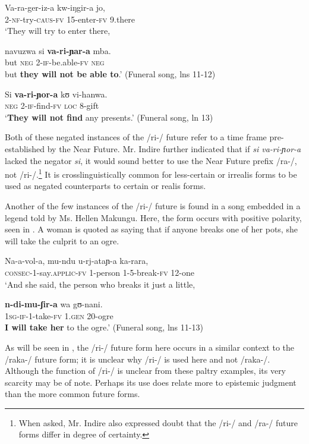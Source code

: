 \documentclass[output=paper]{langsci/langscibook}
\begin{document}
\ea\label{ex:sarvasy:9}
\gll Va-ra-ger-iz-a     kw-iŋgir-a   jo,\\ 
2-\textsc{nf}{}-try\textsc{{}-caus-fv}  15-enter-\textsc{fv}  9.there\\ 
\glt ‘They will try to enter there,

\gll navuzwa   si   \textbf{va-ri-ɲar-a}     mba. \\
but    \textsc{neg}  2-\textsc{if-}be.able-\textsc{fv}  \textsc{neg} \\
\glt but \textbf{they will not be able to}.’ (Funeral song, lns 11-12)
\z

\ea\label{ex:sarvasy:10}
\gll Si   \textbf{va-ri-ɲor-a}   kʊ   vi-hanwa. \\
\textsc{neg}  2-\textsc{if-}find-\textsc{fv}  \textsc{loc}  8-gift \\
\glt ‘\textbf{They will not find} any presents.’ (Funeral song, ln 13)
\z

Both of these negated instances of the /ri-/ future refer to a time frame pre-established by the Near Future. Mr. Indire further indicated that if \textit{si va-ri-ɲor-a }lacked the negator \textit{si}, it would sound better to use the Near Future prefix /ra-/, not /ri-/.\footnote{ When asked, Mr. Indire also expressed doubt that the /ri-/ and /ra-/ future forms differ in degree of certainty.} It is crosslinguistically common for less-certain or irrealis forms to be used as negated counterparts to certain or realis forms. 

Another of the few instances of the /ri-/ future is found in a song embedded in a legend told by Ms. Hellen Makungu. Here, the form occurs with positive polarity, seen in . A woman is quoted as saying that if anyone breaks one of her pots, she will take the culprit to an ogre.

\ea\label{ex:sarvasy:11}
\gll Na-a-vol-a,      mu-ndu  u-rj-ataɲ-a  ka-rara, \\
\textsc{consec-1}{}-say.\textsc{applic-fv}  1-person  1-5-break-\textsc{fv}  12-one \\
\glt ‘And she said, the person who breaks it just a little,

\gll \textbf{n-di-mu-ʃir-a}     wa   gʊ-nani. \\
\textsc{1sg-if-}1-take-\textsc{fv}  \textsc{1.gen}  20-ogre \\
\glt \textbf{I will take her} to the ogre.’ (Funeral song, lns 11-13)
\z

As will be seen in , the /ri-/ future form here occurs in a similar context to the /raka-/ future form; it is unclear why /ri-/ is used here and not /raka-/. Although the function of /ri-/ is unclear from these paltry examples, its very scarcity may be of note. Perhaps its use does relate more to epistemic judgment than the more common future forms.
\end{document}
